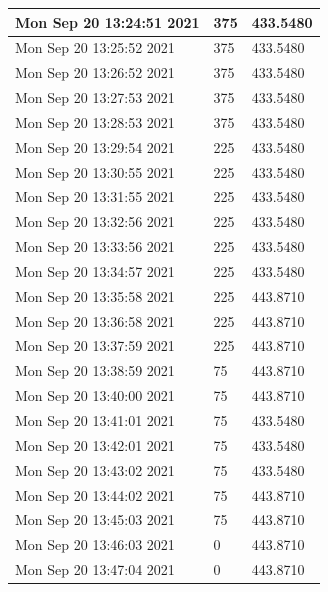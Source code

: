 \begin{longtable}{|l|l|l|}
Mon Sep 20 13:24:51 2021 &                375 &        433.5480 \\ \hline
Mon Sep 20 13:25:52 2021 &                375 &        433.5480 \\ \hline
Mon Sep 20 13:26:52 2021 &                375 &        433.5480 \\ \hline
Mon Sep 20 13:27:53 2021 &                375 &        433.5480 \\ \hline
Mon Sep 20 13:28:53 2021 &                375 &        433.5480 \\ \hline
Mon Sep 20 13:29:54 2021 &                225 &        433.5480 \\ \hline
Mon Sep 20 13:30:55 2021 &                225 &        433.5480 \\ \hline
Mon Sep 20 13:31:55 2021 &                225 &        433.5480 \\ \hline
Mon Sep 20 13:32:56 2021 &                225 &        433.5480 \\ \hline
Mon Sep 20 13:33:56 2021 &                225 &        433.5480 \\ \hline
Mon Sep 20 13:34:57 2021 &                225 &        433.5480 \\ \hline
Mon Sep 20 13:35:58 2021 &                225 &        443.8710 \\ \hline
Mon Sep 20 13:36:58 2021 &                225 &        443.8710 \\ \hline
Mon Sep 20 13:37:59 2021 &                225 &        443.8710 \\ \hline
Mon Sep 20 13:38:59 2021 &                 75 &        443.8710 \\ \hline
Mon Sep 20 13:40:00 2021 &                 75 &        443.8710 \\ \hline
Mon Sep 20 13:41:01 2021 &                 75 &        433.5480 \\ \hline
Mon Sep 20 13:42:01 2021 &                 75 &        433.5480 \\ \hline
Mon Sep 20 13:43:02 2021 &                 75 &        433.5480 \\ \hline
Mon Sep 20 13:44:02 2021 &                 75 &        443.8710 \\ \hline
Mon Sep 20 13:45:03 2021 &                 75 &        443.8710 \\ \hline
Mon Sep 20 13:46:03 2021 &                  0 &        443.8710 \\ \hline
Mon Sep 20 13:47:04 2021 &                  0 &        443.8710 \\ \hline

\end{longtable}
